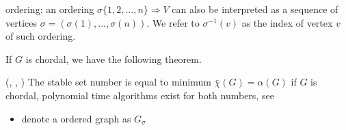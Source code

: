 \documentclass[../main]{subfiles}
\begin{document}
ordering: an ordering \(\sigma \{1, 2, ... , n\} \Rightarrow V\) can
also be interpreted as a sequence of vertices
\(\sigma = (\sigma(1), ... , \sigma(n))\). We refer to
\(\sigma^{−1} (v)\) as the index of vertex \(v\) of such ordering.

If \(G\) is chordal, we have the following theorem.

\begin{theorem}
      (\cite{gavril_algorithms_1972}, \cite{schrijver_combinatorial_2003}, \cite{vandenberghe_chordal_2015})
      The stable set number is equal to minimum  \(\bar \chi (G) = \alpha(G)\) if \(G\) is chordal,
      polynomial time algorithms exist for both numbers, see \cite{gavril_algorithms_1972}
\end{theorem}


\begin{itemize}
      \item denote a ordered graph as \(G_\sigma\)
\end{itemize}



\end{document}
